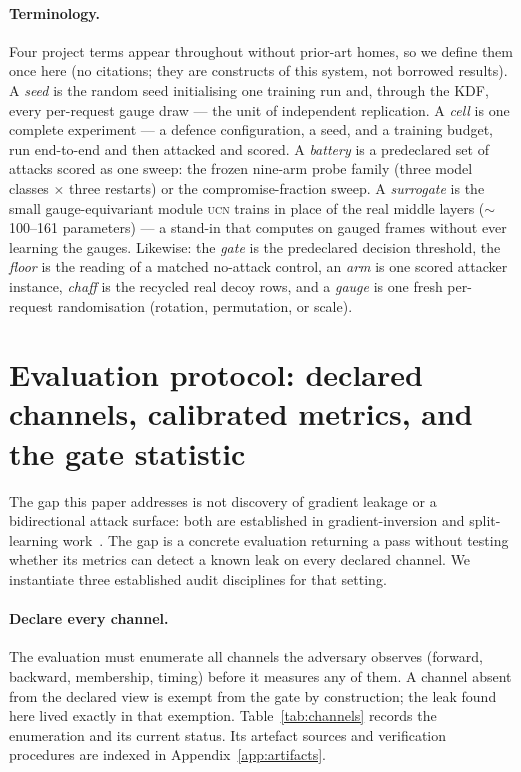 \documentclass[11pt]{article}
\newcommand{\ucn}{\textsc{ucn}}
\begin{document}
\paragraph{Terminology.} Four project terms appear throughout without prior-art
homes, so we define them once here (no citations; they are constructs of this
system, not borrowed results). A \emph{seed} is the random seed initialising one
training run and, through the KDF, every per-request gauge draw --- the unit of
independent replication. A \emph{cell} is one complete experiment --- a defence
configuration, a seed, and a training budget, run end-to-end and then attacked
and scored. A \emph{battery} is a predeclared set of attacks scored as one
sweep: the frozen nine-arm probe family (three model classes $\times$ three
restarts) or the compromise-fraction sweep. A \emph{surrogate} is the small
gauge-equivariant module \ucn{} trains in place of the real middle layers
($\sim$100--161 parameters) --- a stand-in that computes on gauged frames
without ever learning the gauges. Likewise: the \emph{gate} is the predeclared
decision threshold, the \emph{floor} is the reading of a matched no-attack
control, an \emph{arm} is one scored attacker instance, \emph{chaff} is the
recycled real decoy rows, and a \emph{gauge} is one fresh per-request
randomisation (rotation, permutation, or scale).

\section{Evaluation protocol: declared channels, calibrated metrics, and the
gate statistic}
\label{sec:protocol}

The gap this paper addresses is not discovery of gradient leakage or a
bidirectional attack surface: both are established in gradient-inversion and
split-learning work~\cite{zhu2019deep,deng2021tag,bisr}. The gap is a concrete
evaluation returning a pass without testing whether its metrics can detect a
known leak on every declared channel. We instantiate three established audit
disciplines for that setting.

\paragraph{Declare every channel.}
The evaluation must enumerate all channels the adversary observes (forward,
backward, membership, timing) before it measures any of them. A channel absent
from the declared view is exempt from the gate by construction; the leak found
here lived exactly in that exemption. Table~\ref{tab:channels} records the enumeration and its current status. Its
artefact sources and verification procedures are indexed in
Appendix~\ref{app:artifacts}.
\end{document}
